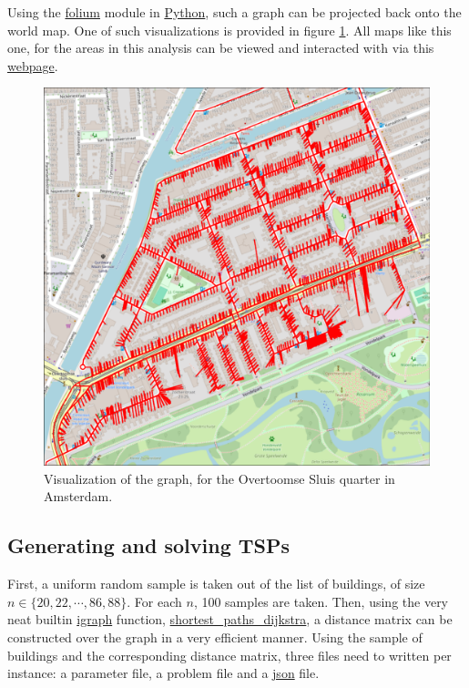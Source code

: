 \documentclass[12pt]{article}
\numberwithin{equation}{section}
\newcommand{\1}[1]{\,I_{#1}} %
\begin{document}
Using the \url{folium} module in \url{Python}, such a graph can be projected back onto the world map.
One of such visualizations is provided in figure \ref{fig:overtoomse_sluis}. All maps like this one,
for the areas in this analysis can be viewed and interacted with via this 
\href{https://koenstevens.nl/wp-content/uploads/maps/}{\url{webpage}}.
\begin{figure}[H]
  \caption{Visualization of the graph, for the Overtoomse Sluis quarter in Amsterdam.}
  \label{fig:overtoomse_sluis}
  \includegraphics[width=\textwidth]{Pictures/Overtoomse_Sluis_roads.png}
\end{figure}
\subsection{Generating and solving TSPs}
First, a uniform random sample is taken out of the list of buildings, of size\\
$n\in\{20, 22, \cdots, 86, 88\}$. For each $n$, 100 samples are taken. Then, using the very neat
builtin \url{igraph} function, \url{shortest_paths_dijkstra}, a distance matrix can be constructed
over the graph in a very efficient manner. Using the sample of buildings and the corresponding 
distance matrix, three files need to written per instance: a parameter file, a problem file and a 
\url{json} file.
\end{document}
